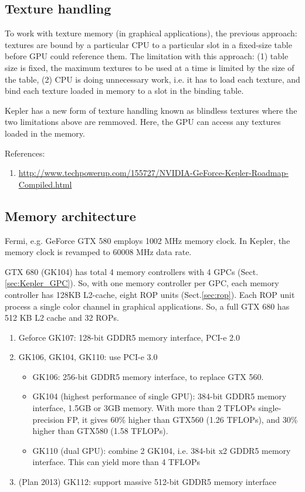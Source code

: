 \subsection{Texture handling}
\label{sec:Kepler_texture-handling}

To work with texture memory (in graphical applications), the previous approach:
textures are bound by a particular CPU to a particular slot in a fixed-size
table before GPU could reference them. The limitation with this approach: (1)
table size is fixed, the maximum textures to be used at a time is limited by the
size of the table, (2) CPU is doing unnecessary work, i.e. it has to load each
texture, and bind each texture loaded in memory to a slot in the binding table.

Kepler has a new form of texture handling known as blindless textures where the
two limitations above are remmoved. Here, the GPU can access any textures loaded
in the memory.


References:
\begin{enumerate}
  \item
  \url{http://www.techpowerup.com/155727/NVIDIA-GeForce-Kepler-Roadmap-Compiled.html}
\end{enumerate}

\subsection{Memory architecture}

Fermi, e.g. GeForce GTX 580 employs 1002 MHz memory clock. In Kepler,
the memory clock is revamped to 60008 MHz data rate.

GTX 680 (GK104) has total 4 memory controllers with 4 GPCs
(Sect.\ref{sec:Kepler_GPC}). So, with one memory controller per GPC, each memory
controller has 128KB L2-cache, eight ROP units (Sect.\ref{sec:rop}). Each ROP
unit process a single color channel in graphical applications. So, a full GTX
680 has 512 KB L2 cache and 32 ROPs.

\begin{enumerate}
  \item Geforce GK107: 128-bit GDDR5 memory interface, PCI-e 2.0
  \item GK106, GK104, GK110: use PCI-e 3.0
  \begin{itemize}
    \item GK106: 256-bit GDDR5 memory interface, to replace GTX 560.
    \item GK104 (highest performance of single GPU): 384-bit GDDR5 memory
    interface, 1.5GB or 3GB memory. With more than 2 TFLOPs single-precision FP,
    it gives 60\% higher than GTX560 (1.26 TFLOPs), and 30\% higher than GTX580
    (1.58 TFLOPs).
    \item GK110 (dual GPU): combine 2 GK104, i.e. 384-bit x2  GDDR5 memory
    interface. This can yield more than 4 TFLOPs
  \end{itemize}
  \item (Plan 2013) GK112: support massive 512-bit GDDR5 memory interface
\end{enumerate}

